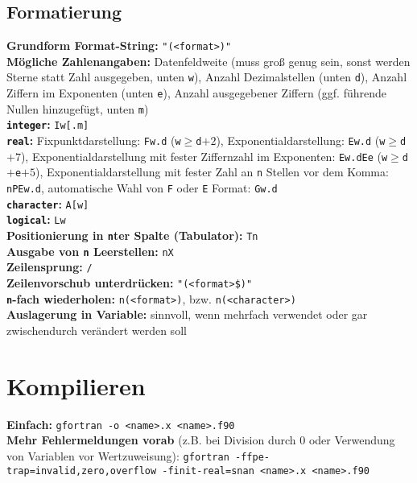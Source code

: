 \documentclass[a4paper, twocolumn]{scrarticle}
\begin{document}
 \subsection{Formatierung}
 \textbf{Grundform Format-String:} \lstinline|"(<format>)"|\\
 \textbf{Mögliche Zahlenangaben:}  Datenfeldweite (muss groß genug sein, sonst werden Sterne statt Zahl ausgegeben, unten \lstinline|w|), Anzahl Dezimalstellen (unten \lstinline|d|), Anzahl Ziffern im Exponenten (unten \lstinline|e|), Anzahl ausgegebener Ziffern (ggf. führende Nullen hinzugefügt, unten \lstinline|m|)\\
 \textbf{\lstinline|integer|:} \lstinline|Iw[.m]|\\
 \textbf{\lstinline|real|:} Fixpunktdarstellung: \lstinline|Fw.d| (\lstinline|w|$\geq$\lstinline|d|$+2$), Exponentialdarstellung: \lstinline|Ew.d| (\lstinline|w|$\geq$\lstinline|d|$+7$), Exponentialdarstellung mit fester Ziffernzahl im Exponenten: \lstinline|Ew.dEe| (\lstinline|w|$\geq$\lstinline|d|$+$\lstinline|e|$+5$), Exponentialdarstellung mit fester Zahl an \lstinline|n| Stellen vor dem Komma: \lstinline|nPEw.d|, automatische Wahl von \lstinline|F| oder \lstinline|E| Format: \lstinline|Gw.d|\\
 \textbf{\lstinline|character|:} \lstinline|A[w]|\\
 \textbf{\lstinline|logical|:} \lstinline|Lw|\\
 \textbf{Positionierung in \lstinline|n|ter Spalte (Tabulator):} \lstinline|Tn|\\
 \textbf{Ausgabe von \lstinline|n| Leerstellen:} \lstinline|nX|\\
 \textbf{Zeilensprung:} \lstinline|/|\\
 \textbf{Zeilenvorschub unterdrücken:} \lstinline|"(<format>$)"|\\
 \textbf{\lstinline|n|-fach wiederholen:} \lstinline|n(<format>)|, bzw. \lstinline|n(<character>)|\\
 \textbf{Auslagerung in Variable:} sinnvoll, wenn mehrfach verwendet oder gar zwischendurch verändert werden soll
  
  \section{Kompilieren}
  \textbf{Einfach:} \lstinline[style=neutral]|gfortran -o <name>.x <name>.f90| \\
  \textbf{Mehr Fehlermeldungen vorab} (z.B. bei Division durch 0 oder Verwendung von Variablen vor Wertzuweisung): \lstinline[style=neutral]|gfortran -ffpe-trap=invalid,zero,overflow -finit-real=snan <name>.x <name>.f90|
\end{document}
